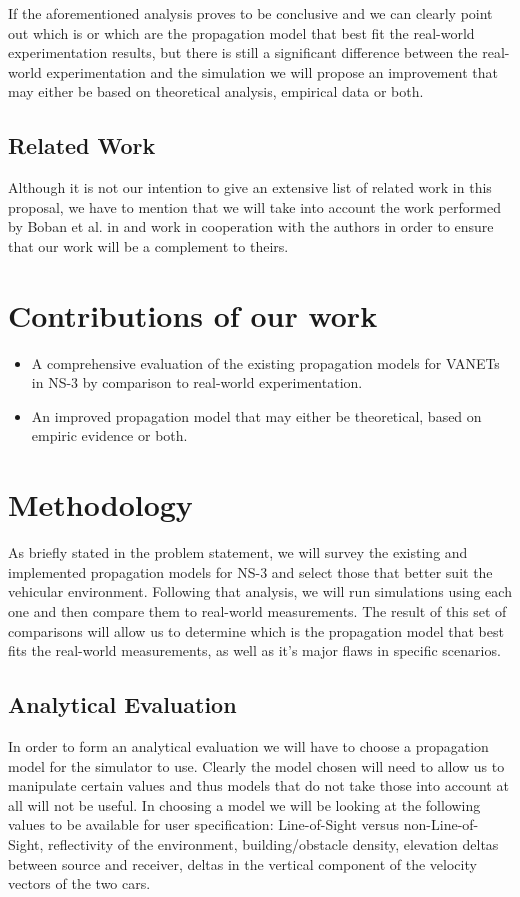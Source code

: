 \documentclass[11pt,letter]{article}
\begin{document}
If the aforementioned analysis proves to be conclusive and we can clearly point out which is or which are the propagation model that best fit the real-world experimentation results, but there is still a significant difference between the real-world experimentation and the simulation we will propose an improvement that may either be based on theoretical analysis, empirical data or both.

\subsection{Related Work}
Although it is not our intention to give an extensive list of related work in this proposal, we have to mention that we will take into account the work performed by Boban et al. in \cite{Boban:2011p246} and work in cooperation with the authors in order to ensure that our work will be a complement to theirs.

\section{Contributions of our work}
\begin{itemize}\itemsep2pt
	\item A comprehensive evaluation of the existing propagation models for VANETs in NS-3 by comparison to real-world experimentation.
	\item An improved propagation model that may either be theoretical, based on empiric evidence or both.
\end{itemize}
\section{Methodology}
As briefly stated in the problem statement, we will survey the existing and implemented propagation models for NS-3 and select those that better suit the vehicular environment. Following that analysis, we will run simulations using each one and then compare them to real-world measurements. The result of this set of comparisons will allow us to determine which is the propagation model that best fits the real-world measurements, as well as it's major flaws in specific scenarios.

\subsection{Analytical Evaluation}
In order to form an analytical evaluation we will have to choose a
propagation model for the simulator to use. Clearly the model chosen
will need to allow us to manipulate certain values and thus models that
do not take those into account at all will not be useful. In choosing a
model we will be looking at the following values to be available for
user specification: Line-of-Sight versus non-Line-of-Sight, reflectivity
of the environment, building/obstacle density, elevation deltas between
source and receiver, deltas in the vertical component of the velocity
vectors of the two cars.
\end{document}
